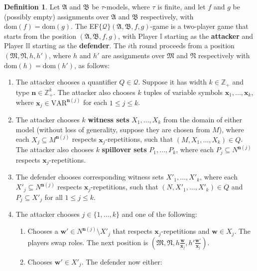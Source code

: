 \documentclass{article}
\theoremstyle{definition}
\newtheorem{definition}[theorem]{Definition}
\begin{document}
\begin{definition}
    Let $\mathfrak{A}$ and $\mathfrak{B}$ be $\tau$-models, where $\tau$ is finite, and let $f$ and $g$ be (possibly empty) assignments over $\mathfrak{A}$ and $\mathfrak{B}$ respectively, with $\mathrm{dom}(f)=\mathrm{dom}(g)$. The EF$\{\mathcal Q\}(\mathfrak{A},\mathfrak{B}, f,g)$-game is a two-player game that starts from the position $(\mathfrak{A},\mathfrak{B},f,g)$, with Player $\mathbb I$ starting as the \textbf{attacker} and Player $\mathbb I\mathbb I$ starting as the \textbf{defender}. The $i$th round proceeds from a position $(\mathfrak{M},\mathfrak{N},h,h')$, where $h$ and $h'$ are assignments over $\mathfrak{M}$ and $\mathfrak{N}$ respectively with $\mathrm{dom}(h)=\mathrm{dom}(h')$, as follows:
    \begin{enumerate}
        \item The attacker chooses a quantifier $Q\in \mathcal{Q}$. Suppose it has width $k\in\mathbb{Z}_+$ and type $\textbf{n}\in\mathbb{Z}_+^k$. The attacker also chooses $k$ tuples     of variable symbols     $\mathbf{x}_1,\ldots,\mathbf{x}_k$, where $\mathbf{x}_j\in\mathrm{VAR}^{\mathbf{n}(j)}$ for each     $1\leq j\leq k$.
        \item The attacker chooses $k$ \textbf{witness sets} $X_1,\dots,X_k$ from the domain of either model (without loss of generality, suppose they are chosen from $M$), where each $X_j\subseteq M^{\textbf{n}(j)}$ respects $\textbf{x}_j$-repetitions, such that $(M,X_1,\dots,X_k)\in Q$. The attacker also chooses $k$ \textbf{spillover sets} $P_1,\dots,P_k$, where each $P_j\subseteq N^{\textbf{n}(j)}$ respects $\textbf{x}_j$-repetitions.
        \item The defender chooses corresponding witness sets $X'_1,\dots,X'_k$, where each $X'_j\subseteq N^{\textbf{n}(j)}$ respects $\textbf{x}_j$-repetitions, such that $(N,X'_1,\dots,X'_k)\in Q$ and $P_j\subseteq X'_j$ for all $1 \leq j \leq k$.
        \item The attacker chooses $j\in\{1,\dots,k\}$ and one of the following:
        \begin{enumerate}
            \item Chooses a $\textbf{w}'\in N^{\textbf{n}(j)}\setminus X'_j$ that respects $\textbf{x}_j$-repetitions and $\textbf{w}\in X_j$. The players swap roles. The next position         is $(\mathfrak{M},\mathfrak{N},         h\frac{\mathbf{w}}{\mathbf{x}_j},         h'\frac{\mathbf{w}'}{\mathbf{x}_j})$.
           \item Chooses $\mathbf{w}'\in X'_j$. The defender now either:

\end{enumerate}
\end{enumerate}
\end{definition}
\end{document}
